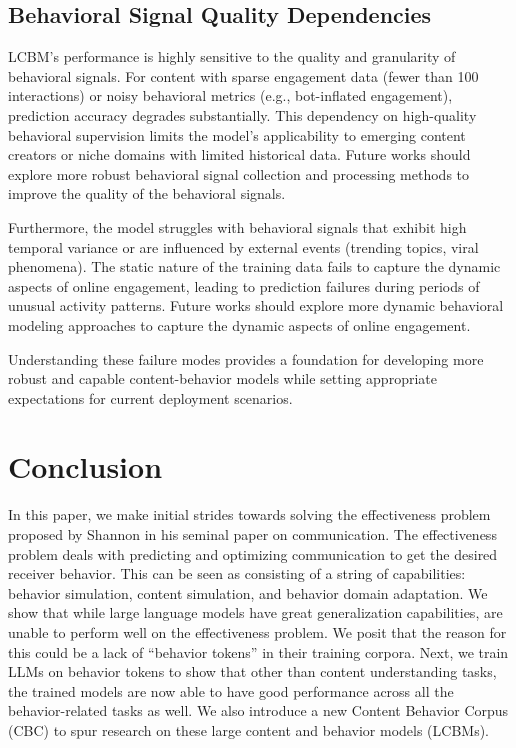 \subsection{Behavioral Signal Quality Dependencies}

LCBM's performance is highly sensitive to the quality and granularity of behavioral signals. For content with sparse engagement data (fewer than 100 interactions) or noisy behavioral metrics (e.g., bot-inflated engagement), prediction accuracy degrades substantially. This dependency on high-quality behavioral supervision limits the model's applicability to emerging content creators or niche domains with limited historical data. Future works should explore more robust behavioral signal collection and processing methods to improve the quality of the behavioral signals.

Furthermore, the model struggles with behavioral signals that exhibit high temporal variance or are influenced by external events (trending topics, viral phenomena). The static nature of the training data fails to capture the dynamic aspects of online engagement, leading to prediction failures during periods of unusual activity patterns. Future works should explore more dynamic behavioral modeling approaches to capture the dynamic aspects of online engagement.


Understanding these failure modes provides a foundation for developing more robust and capable content-behavior models while setting appropriate expectations for current deployment scenarios.

\section{Conclusion}
In this paper, we make initial strides towards solving the effectiveness problem proposed by Shannon in his seminal paper on communication. The effectiveness problem deals with predicting and optimizing communication to get the desired receiver behavior. This can be seen as consisting of a string of capabilities: behavior simulation, content simulation, and behavior domain adaptation. We show that while large language models have great generalization capabilities, are unable to perform well on the effectiveness problem. We posit that the reason for this could be a lack of ``behavior tokens'' in their training corpora. Next, we train LLMs on behavior tokens to show that other than content understanding tasks, the trained models are now able to have good performance across all the behavior-related tasks as well. We also introduce a new Content Behavior Corpus (CBC) to spur research on these large content and behavior models (LCBMs).







